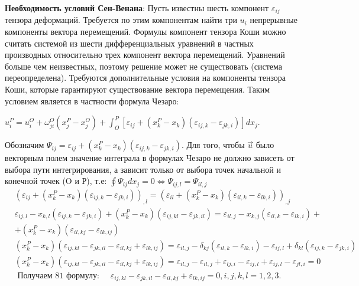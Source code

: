 \textbf{Необходимость условий Сен-Венана}:
Пусть известны шесть компонент $\varepsilon_{ij}$ тензора деформаций. Требуется по этим компонентам найти три $u_{i}$
непрерывные компоненты вектора перемещений. Формулы компонент тензора Коши можно считать
системой из шести дифференциальных уравнений в частных производных относительно трех компонент
вектора перемещений. Уравнений больше чем неизвестных, поэтому решение может не существовать
(система переопределена). Требуются дополнительные условия на компоненты тензора Коши, которые
гарантируют существование вектора перемещения. Таким условием является в частности формула Чезаро:


$ \displaystyle
u_i^P=u_i^O+\omega_{j i}^O\left(x_j^P-x_j^O\right)+\int_O^P\left[\varepsilon_{i j}+\left(x_k^P-x_k\right)\left(\varepsilon_{i j, k}-\varepsilon_{j k, i}\right)\right] d x_j.
$


 Обозначим $\Psi_{i j}=\varepsilon_{i j}+\left(x_k^P-x_k\right)\left(\varepsilon_{i j, k}-\varepsilon_{j k, i}\right)$. Для того, чтобы $\vec{u}$ было векторным полем значение интеграла в формулах Чезаро не должно зависеть от выбора пути интегрирования, а зависит только от выбора точек начальной и конечной точек (O и Р), т.е: $\oint \Psi_{i j} d x_j=0 \Leftrightarrow \Psi_{i j, l}=\Psi_{i l,j}$
$$
\begin{aligned}
& \left(\varepsilon_{i j}+\left(x_k^P-x_k\right)\left(\varepsilon_{i j, k}-\varepsilon_{j k, i}\right)\right)_{, l}=\left(\varepsilon_{i l}+\left(x_k^P-x_k\right)\left(\varepsilon_{i l, k}-\varepsilon_{l k, i}\right)\right)_{, j} \\
& \varepsilon_{i j, l}-x_{k, l}\left(\varepsilon_{i j, k}-\varepsilon_{j k, i}\right)+\left(x_k^P-x_k\right)\left(\varepsilon_{i j, k l}-\varepsilon_{j k, i l}\right)=\varepsilon_{i l, j}-x_{k, j}\left(\varepsilon_{i l, k}-\varepsilon_{l k, i}\right)+\\ &+\left(x_k^P-x_k\right)\left(\varepsilon_{i l, k j}-\varepsilon_{l k, i j}\right) \\
& \left(x_k^P-x_k\right)\left(\varepsilon_{i j, k l}-\varepsilon_{j k, i l}-\varepsilon_{i l, k j}+\varepsilon_{l k, i j}\right)=\varepsilon_{i l, j}-\delta_{k j}\left(\varepsilon_{i l, k}-\varepsilon_{l k, i}\right)-\varepsilon_{i j, l}+\delta_{k l}\left(\varepsilon_{i j, k}-\varepsilon_{j k, i}\right) \\
& \left(x_k^P-x_k\right)\left(\varepsilon_{i j, k l}-\varepsilon_{j k, i l}-\varepsilon_{i l, k j}+\varepsilon_{l k, i j}\right)=\varepsilon_{i l, j}-\varepsilon_{i l, j}+\varepsilon_{l j, i}-\varepsilon_{i j, l}+\varepsilon_{i j, l}-\varepsilon_{j l, i}=0 \\
& \text { Получаем } 81 \text { формулу: } \quad \varepsilon_{i j, k l}-\varepsilon_{j k, i l}-\varepsilon_{i l, k j}+\varepsilon_{l k, i j}=0, i, j, k, l=1,2,3.
\end{aligned}
$$


